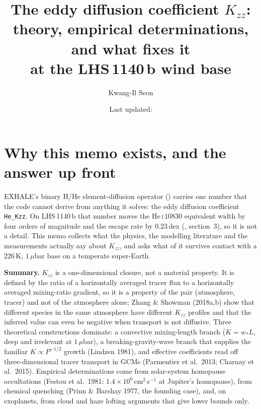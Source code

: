 \documentclass[english,a4paper]{my_memo}
\title{The eddy diffusion coefficient $K_{zz}$:\\
       theory, empirical determinations, and what fixes it\\
       at the LHS\,1140\,b wind base}
\author{Kwang-Il Seon}
\date{Last updated: \docmoddate}
\begin{document}
\maketitle

\section{Why this memo exists, and the answer up front}

EXHALE's binary H/He element-diffusion operator
() carries one number
that the code cannot derive from anything it solves: the eddy diffusion
coefficient \texttt{He\_Kzz}. On LHS\,1140\,b that number moves the
He\,\textsc{i}\,$10830$ equivalent width by four orders of magnitude and the
escape rate by $0.23$\,dex (, section~3),
so it is not a detail. This memo collects what the physics, the modelling
literature and the measurements actually say about $K_{zz}$, and asks what
of it survives contact with a $226$\,K, $1\,\mu$bar base on a temperate
super-Earth.

\medskip
\noindent\textbf{Summary.} $K_{zz}$ is a one-dimensional closure, not a
material property. It is defined by the ratio of a horizontally averaged
tracer flux to a horizontally averaged mixing-ratio gradient, so it is a
property of the pair (atmosphere, tracer) and not of the atmosphere alone;
Zhang \& Showman (2018a,b) show that different species in the same
atmosphere have different $K_{zz}$ profiles and that the inferred value can
even be negative when transport is not diffusive. Three theoretical
constructions dominate: a convective mixing-length branch
($K = w_* L$, deep and irrelevant at $1\,\mu$bar), a breaking-gravity-wave
branch that supplies the familiar $K \propto P^{-1/2}$ growth
(Lindzen 1981), and effective coefficients read off three-dimensional
tracer transport in GCMs (Parmentier et al.\ 2013; Charnay et al.\ 2015).
Empirical determinations come from solar-system homopause occultations
(Festou et al.\ 1981: $1.4\times10^{6}$\,cm$^{2}$\,s$^{-1}$ at Jupiter's
homopause), from chemical quenching (Prinn \& Barshay 1977, the founding
case), and, on exoplanets, from cloud and haze lofting arguments that give
lower bounds only.
\end{document}
